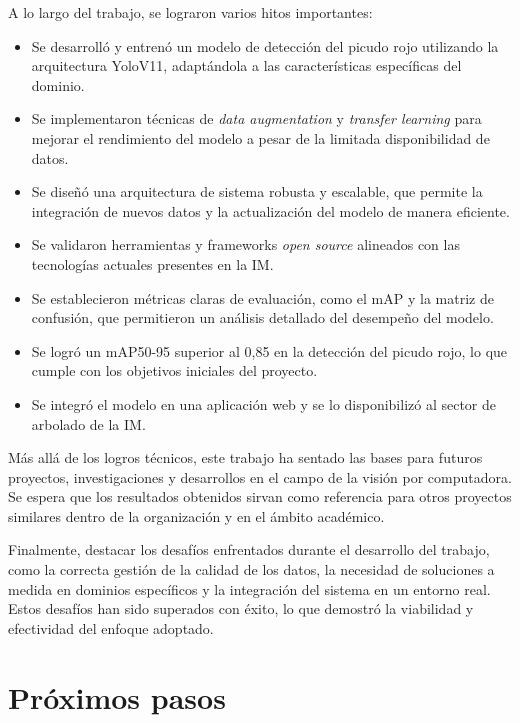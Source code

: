 A lo largo del trabajo, se lograron varios hitos importantes:

\begin{itemize}
    \item Se desarrolló y entrenó un modelo de detección del picudo rojo utilizando la arquitectura YoloV11, adaptándola a las características específicas del dominio.
    \item Se implementaron técnicas de \textit{data augmentation} y \textit{transfer learning} para mejorar el rendimiento del modelo a pesar de la limitada disponibilidad de datos.
    \item Se diseñó una arquitectura de sistema robusta y escalable, que permite la integración de nuevos datos y la actualización del modelo de manera eficiente.
    \item Se validaron herramientas y frameworks \textit{open source} alineados con las tecnologías actuales presentes en la IM.
    \item Se establecieron métricas claras de evaluación, como el mAP y la matriz de confusión, que permitieron un análisis detallado del desempeño del modelo.
    \item Se logró un mAP50-95 superior al 0,85 en la detección del picudo rojo, lo que cumple con los objetivos iniciales del proyecto.
    \item Se integró el modelo en una aplicación web y se lo disponibilizó al sector de arbolado de la IM.
\end{itemize}

Más allá de los logros técnicos, este trabajo ha sentado las bases para futuros proyectos, investigaciones y desarrollos en el campo de la visión por computadora. Se espera que los resultados obtenidos sirvan como referencia para otros proyectos similares dentro de la organización y en el ámbito académico.

Finalmente, destacar los desafíos enfrentados durante el desarrollo del trabajo, como la correcta gestión de la calidad de los datos, la necesidad de soluciones a medida en dominios específicos y la integración del sistema en un entorno real. Estos desafíos han sido superados con éxito, lo que demostró la viabilidad y efectividad del enfoque adoptado.

\section{Próximos pasos}

